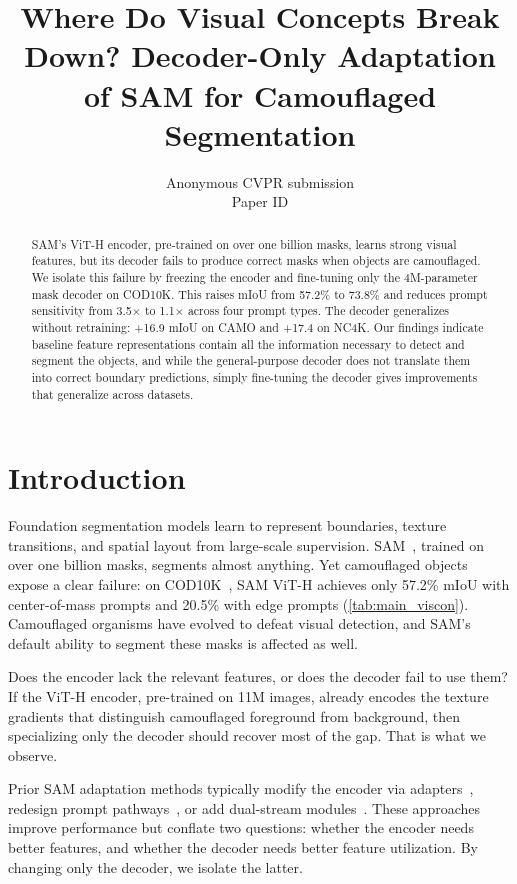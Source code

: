 \documentclass[10pt,twocolumn,letterpaper]{article}
\title{Where Do Visual Concepts Break Down? Decoder-Only Adaptation of SAM for Camouflaged Segmentation}
\author{Anonymous CVPR submission\\Paper ID \paperID}
\begin{document}
\maketitle

\begin{abstract}
SAM's ViT-H encoder, pre-trained on over one billion masks, learns strong visual features, but its decoder fails to produce correct masks when objects are camouflaged. We isolate this failure by freezing the encoder and fine-tuning only the 4M-parameter mask decoder on COD10K. This raises mIoU from 57.2\% to 73.8\% and reduces prompt sensitivity from 3.5$\times$ to 1.1$\times$ across four prompt types. The decoder generalizes without retraining: +16.9 mIoU on CAMO and +17.4 on NC4K. Our findings indicate baseline feature representations contain all the information necessary to detect and segment the objects, and while the general-purpose decoder does not translate them into correct boundary predictions, simply fine-tuning the decoder gives improvements that generalize across datasets.
\end{abstract}

\section{Introduction}

Foundation segmentation models learn to represent boundaries, texture transitions, and spatial layout from large-scale supervision. SAM~\cite{kirillov2023sam,ravi2024sam2}, trained on over one billion masks, segments almost anything. Yet camouflaged objects expose a clear failure: on COD10K~\cite{fan2020cod10k}, SAM ViT-H achieves only 57.2\% mIoU with center-of-mass prompts and 20.5\% with edge prompts (\cref{tab:main_viscon}). Camouflaged organisms have evolved to defeat visual detection, and SAM's default ability to segment these masks is affected as well.

Does the encoder lack the relevant features, or does the decoder fail to use them? If the ViT-H encoder, pre-trained on 11M images, already encodes the texture gradients that distinguish camouflaged foreground from background, then specializing only the decoder should recover most of the gap. That is what we observe.

Prior SAM adaptation methods typically modify the encoder via adapters~\cite{chen2023samadapter}, redesign prompt pathways~\cite{hao2024comprompter}, or add dual-stream modules~\cite{liu2025dualstream}. These approaches improve performance but conflate two questions: whether the encoder needs better features, and whether the decoder needs better feature utilization. By changing only the decoder, we isolate the latter.
\end{document}

